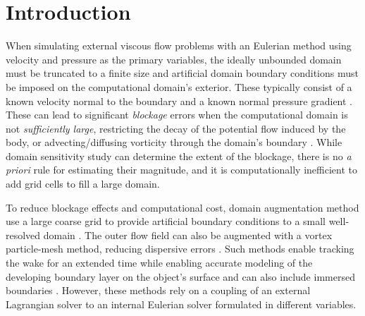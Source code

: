 \documentclass[11pt]{article}
\begin{document}
\section{Introduction}
When simulating external viscous flow problems with an Eulerian method using velocity and pressure as the primary variables, the ideally unbounded domain must be truncated to a finite size and artificial domain boundary conditions must be imposed on the computational domain's exterior. These typically consist of a known velocity normal to the boundary and a known normal pressure gradient \cite{Gresho1987}. These can lead to significant \emph{blockage} errors when the computational domain is not \emph{sufficiently large}, restricting the decay of the potential flow induced by the body, or advecting/diffusing vorticity through the domain's boundary \cite{Colonius2008}. While domain sensitivity study can determine the extent of the blockage, there is no \emph{a priori} rule for estimating their magnitude, and it is computationally inefficient to add grid cells to fill a large domain.

To reduce blockage effects and computational cost, domain augmentation method use a large coarse grid to provide artificial boundary conditions to a small well-resolved domain \cite{Colonius2008}. The outer flow field can also be augmented with a vortex particle-mesh method, reducing dispersive errors \cite{Billuart2023AFlows}. Such methods enable tracking the wake for an extended time while enabling accurate modeling of the developing boundary layer on the object's surface and can also include immersed boundaries \cite{Marichal2015UnboundedMethods}. However, these methods rely on a coupling of an external Lagrangian solver to an internal Eulerian solver formulated in different variables.
\end{document}
